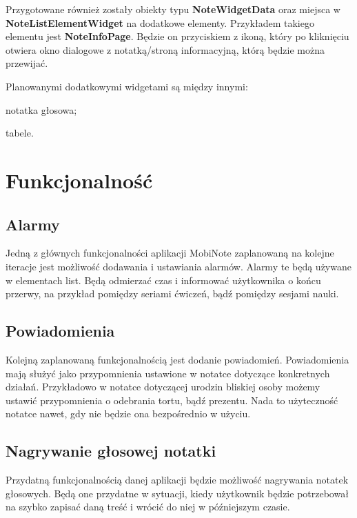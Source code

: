 Przygotowane również zostały obiekty typu \textbf{NoteWidgetData} oraz miejsca w \textbf{NoteListElementWidget} na dodatkowe elementy. Przykładem takiego elementu jest \textbf{NoteInfoPage}. Będzie on przyciskiem z ikoną, który po kliknięciu otwiera okno dialogowe z notatką/stroną informacyjną, którą będzie można przewijać.

Planowanymi dodatkowymi widgetami są między innymi:

\begin{compactitem}
    \item notatka głosowa;
    \item tabele.
\end{compactitem}

\section{Funkcjonalność}

\subsection{Alarmy}

Jedną z głównych funkcjonalności aplikacji MobiNote zaplanowaną na kolejne iteracje jest możliwość dodawania i ustawiania alarmów. Alarmy te będą używane w elementach list. Będą odmierzać czas i informować użytkownika o końcu przerwy, na przykład pomiędzy seriami ćwiczeń, bądź pomiędzy sesjami nauki.

\subsection{Powiadomienia}

Kolejną zaplanowaną funkcjonalnością jest dodanie powiadomień. Powiadomienia mają służyć jako przypomnienia ustawione w notatce dotyczące konkretnych działań. Przykładowo w notatce dotyczącej urodzin bliskiej osoby możemy ustawić przypomnienia o odebrania tortu, bądź prezentu. Nada to użyteczność notatce nawet, gdy nie będzie ona bezpośrednio w użyciu.

\subsection{Nagrywanie głosowej notatki}

Przydatną funkcjonalnością danej aplikacji będzie możliwość nagrywania notatek głosowych. Będą one przydatne w sytuacji, kiedy użytkownik będzie potrzebował na szybko zapisać daną treść i wrócić do niej w późniejszym czasie.

